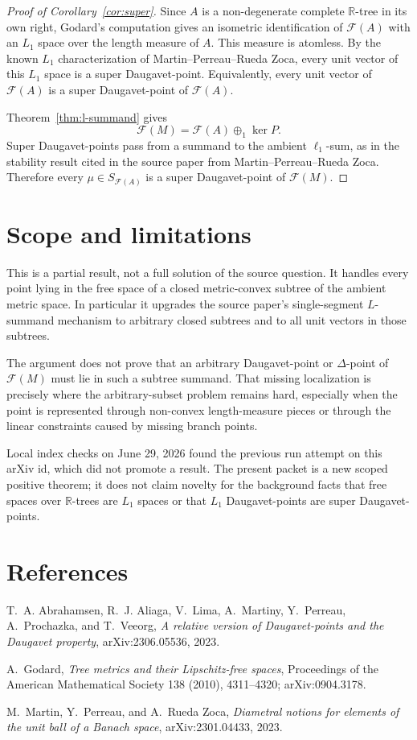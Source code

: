 \documentclass[11pt]{article}
\theoremstyle{definition}
\theoremstyle{remark}
\newcommand{\R}{\mathbb R}
\newcommand{\F}{\mathcal F}
\begin{document}
\begin{proof}[Proof of Corollary~\ref{cor:super}]
Since $A$ is a non-degenerate complete $\R$-tree in its own right, Godard's
computation gives an isometric identification of $\F(A)$ with an $L_1$
space over the length measure of $A$.  This measure is atomless.  By the
known $L_1$ characterization of Martin--Perreau--Rueda Zoca, every unit
vector of this $L_1$ space is a super Daugavet-point.  Equivalently, every
unit vector of $\F(A)$ is a super Daugavet-point of $\F(A)$.

Theorem~\ref{thm:l-summand} gives
\[
  \F(M)=\F(A)\oplus_1\ker P.
\]
Super Daugavet-points pass from a summand to the ambient $\ell_1$-sum, as in
the stability result cited in the source paper from Martin--Perreau--Rueda
Zoca.  Therefore every $\mu\in S_{\F(A)}$ is a super Daugavet-point of
$\F(M)$.
\end{proof}

\section{Scope and limitations}

This is a partial result, not a full solution of the source question.  It
handles every point lying in the free space of a closed metric-convex subtree
of the ambient metric space.  In particular it upgrades the source paper's
single-segment $L$-summand mechanism to arbitrary closed subtrees and to all
unit vectors in those subtrees.

The argument does not prove that an arbitrary Daugavet-point or
$\Delta$-point of $\F(M)$ must lie in such a subtree summand.  That missing
localization is precisely where the arbitrary-subset problem remains hard,
especially when the point is represented through non-convex length-measure
pieces or through the linear constraints caused by missing branch points.

Local index checks on June 29, 2026 found the previous run attempt on this
arXiv id, which did not promote a result.  The present packet is a new scoped
positive theorem; it does not claim novelty for the background facts that free
spaces over $\R$-trees are $L_1$ spaces or that $L_1$ Daugavet-points are
super Daugavet-points.

\section{References}

\begin{enumerate}[label={[\arabic*]},leftmargin=2.2em]
\item T.~A. Abrahamsen, R.~J. Aliaga, V.~Lima, A.~Martiny, Y.~Perreau,
A.~Prochazka, and T.~Veeorg, \emph{A relative version of Daugavet-points and
the Daugavet property}, arXiv:2306.05536, 2023.
\item A.~Godard, \emph{Tree metrics and their Lipschitz-free spaces},
Proceedings of the American Mathematical Society 138 (2010), 4311--4320;
arXiv:0904.3178.
\item M.~Martin, Y.~Perreau, and A.~Rueda Zoca, \emph{Diametral notions for
elements of the unit ball of a Banach space}, arXiv:2301.04433, 2023.
\end{enumerate}
\end{document}

